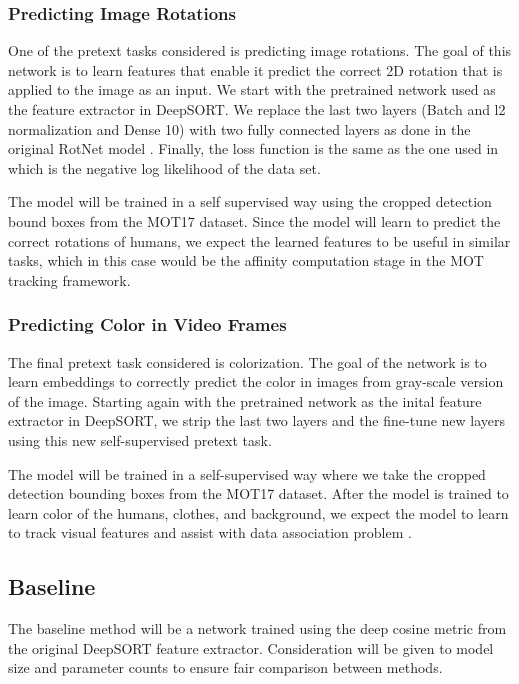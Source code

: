 \documentclass[10pt,twocolumn,letterpaper]{article}
\begin{document}
\subsubsection{Predicting Image Rotations}
One of the pretext tasks considered is predicting image rotations. The goal of this network is to learn features that enable it predict the correct 2D rotation that is applied to the image as an input. We start with the pretrained network used as the feature extractor in DeepSORT. We replace the last two layers (Batch and l2 normalization and Dense 10) with two fully connected layers as done in the original RotNet model \cite{Johnson20}. Finally, the loss function is the same as the one used in \cite{gidaris2018unsupervised} which is the negative log likelihood of the data set.


The model will be trained in a self supervised way using the cropped detection bound boxes from the MOT17 dataset. Since the model will learn to predict the correct rotations of humans, we expect the learned features to be useful in similar tasks, which in this case would be the affinity computation stage in the MOT tracking framework. 

\subsubsection{Predicting Color in Video Frames}
The final pretext task considered is colorization. The goal of the network is to learn embeddings to correctly predict the color in images from gray-scale version of the image. Starting again with the pretrained network as the inital feature extractor in DeepSORT, we strip the last two layers and the fine-tune new layers using this new self-supervised pretext task. 

The model will be trained in a self-supervised way where we take the cropped detection bounding boxes from the MOT17 dataset. After the model is trained to learn color of the humans, clothes, and background, we expect the model to learn to track visual features and assist with data association problem \cite{Vondrick_2018_ECCV}.



\subsection{Baseline}
The baseline method will be a network trained using the deep cosine metric \cite{Wojke2018cosine} from the original DeepSORT feature extractor. Consideration will be given to model size and parameter counts to ensure fair comparison between methods.
\end{document}
